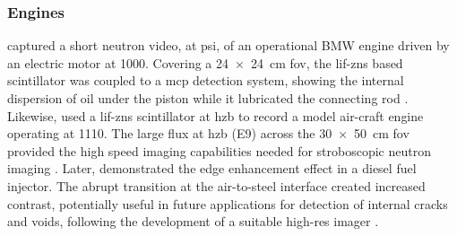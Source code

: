 \documentclass[../../../main.tex]{subfiles}%
\begin{document}
%
    \subsubsection{Engines}%
    \label{sec:chapter-1:motivation:engines}%
    \citeauthor*{Schillinger_2005} captured a short neutron video, at \gls{psi}, of an operational BMW engine driven by an electric motor at \SI{1000}{\rpm}.
    Covering a \SI{24x24}{\centi\meter} \gls{fov}, the \gls{lif-zns} based scintillator was coupled to a \gls{mcp} detection system, showing the internal dispersion of oil under the piston while it lubricated the connecting rod \cite{Schillinger_2005}.
    Likewise, \citeauthor*{Kardjilov_2005} used a \gls{lif-zns} scintillator at \gls{hzb} to record a model air-craft engine operating at \SI{1110}{\rpm}.
    The large flux at \gls{hzb} (\SI{E9}{\neutronflux}) across the \SI{30x50}{\centi\meter} \gls{fov} provided the high speed imaging capabilities needed for stroboscopic neutron imaging \cite{Kardjilov_2005}.
    Later, \citeauthor*{Butler_2013} demonstrated the edge enhancement effect in a diesel fuel injector.
    The abrupt transition at the air-to-steel interface created increased contrast, potentially useful in future applications for detection of internal cracks and voids, following the development of a suitable \gls{high-res} imager \cite{Butler_2013}.
\end{document}
